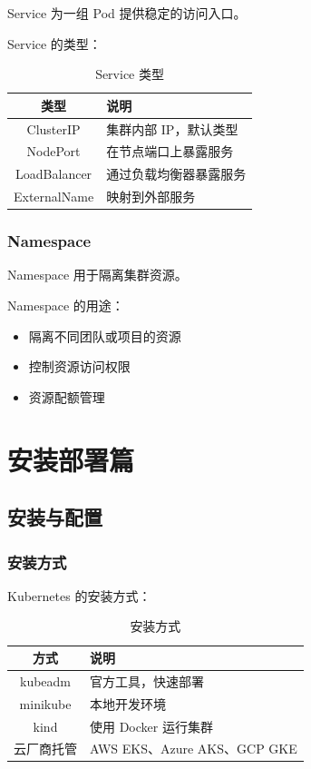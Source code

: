 \documentclass[12pt,UTF8]{ctexbook}
\begin{document}
Service 为一组 Pod 提供稳定的访问入口。

Service 的类型：
\begin{table}[htbp]
    \centering
    \caption{Service 类型}
    \begin{tabular}{|c|p{8cm}|}
        \hline
        \textbf{类型} & \textbf{说明} \\
        \hline
        ClusterIP & 集群内部 IP，默认类型 \\
        \hline
        NodePort & 在节点端口上暴露服务 \\
        \hline
        LoadBalancer & 通过负载均衡器暴露服务 \\
        \hline
        ExternalName & 映射到外部服务 \\
        \hline
    \end{tabular}
\end{table}

\section{Namespace}
\label{sec:namespace}

Namespace 用于隔离集群资源。

Namespace 的用途：
\begin{itemize}
    \item 隔离不同团队或项目的资源
    \item 控制资源访问权限
    \item 资源配额管理
\end{itemize}

\part{安装部署篇}

\chapter{安装与配置}
\label{chap:installation}

\section{安装方式}
\label{sec:installation_methods}

Kubernetes 的安装方式：
\begin{table}[htbp]
    \centering
    \caption{安装方式}
    \begin{tabular}{|c|p{8cm}|}
        \hline
        \textbf{方式} & \textbf{说明} \\
        \hline
        kubeadm & 官方工具，快速部署 \\
        \hline
        minikube & 本地开发环境 \\
        \hline
        kind & 使用 Docker 运行集群 \\
        \hline
        云厂商托管 & AWS EKS、Azure AKS、GCP GKE \\
        \hline
    \end{tabular}
\end{table}
\end{document}
